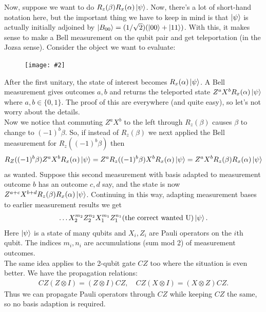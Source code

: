 \documentclass{book}
\theoremstyle{definition}
\newcommand{\al}{\alpha}
\newcommand{\be}{\beta}
\newcommand{\fig}[2]{
	\begin{figure}[!htb]
		\centering
		\texttt{[image: \#2]}
	\end{figure}}
\begin{document}
Now, suppose we want to do $R_z(\be)R_x(\al)\ket{\psi}$. Now, there's a lot of short-hand notation here, but the important thing we have to keep in mind is that $\ket{\psi}$ is actually initially adjoined by $\ket{B_{00}} = (1/\sqrt{2})(\ket{00} + \ket{11})$. With this, it makes sense to make a Bell measurement on the qubit pair and get teleportation (in the Jozsa sense). Consider the object we want to evaluate:

\fig{0.3}{bell-measure}

After the first unitary, the state of interest becomes $R_x(\al)\ket{\psi}$. A Bell measurement gives outcomes $a,b$ and returns the teleported state $Z^a X^b R_x(\al)\ket{\psi}$ where $a,b\in \{0,1\}$. The proof of this are everywhere (and quite easy), so let's not worry about the details. \\

Now we notice that commuting $Z^a X^b$ to the left through $R_z(\be)$ causes $\beta$ to change to $(-1)^b \beta$. So, if instead of $R_z(\beta)$ we next applied the Bell measurement for $R_z((-1)^b \beta)$ then 
\begin{align}
R_Z((-1)^b \beta) Z^a X^b R_x(\al)\ket{\psi} = Z^a R_z((-1)^b\beta)X^b R_x(\al)\ket{\psi}= Z^a X^b R_z(\beta)R_x(\al)\ket{\psi}
\end{align}
as wanted. Suppose this second measurement with basis adapted to measurement outcome $b$ has an outcome $c,d$ say, and the state is now $Z^{a+c} X^{b+d} R_z(\beta) R_x(\al) \ket{\psi}$. Continuing in this way, adapting measurement bases to earlier measurement results we get
\begin{align}
\dots X_2^{m_2}Z_2^{n_2}X_1^{m_1}Z_1^{n_1} \text{(the correct wanted U)} \ket{\psi}.
\end{align}
Here $\ket{\psi}$ is a state of many qubits and $X_i, Z_i$ are Pauli operators on the $i$th qubit. The indices $m_i,n_i$ are accumulations (sum mod 2) of measurement outcomes. \\

The same idea applies to the 2-qubit gate $CZ$ too where the situation is even better. We have the propagation relations:
\begin{align}
CZ(Z\otimes I) = (Z\otimes I)CZ,\quad CZ(X\otimes I) = (X\otimes Z) CZ.
\end{align}
Thus we can propagate Pauli operators through $CZ$ while keeping $CZ$ the same, so no basis adaption is required.\\
\end{document}
